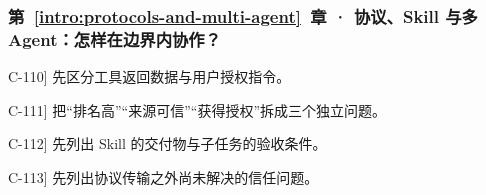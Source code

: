 \subsubsection*{第~\ref*{intro:protocols-and-multi-agent}~章 · 协议、Skill 与多 Agent：怎样在边界内协作？}
\begin{answerhints}
\item[\hyperref[exercise:retrieved-instruction-boundary]{C-110}] \leavevmode{}\label{hint:retrieved-instruction-boundary}先区分工具返回数据与用户授权指令。
\item[\hyperref[exercise:source-permission-boundaries]{C-111}] \leavevmode{}\label{hint:source-permission-boundaries}把“排名高”“来源可信”“获得授权”拆成三个独立问题。
\item[\hyperref[exercise:skill-subagent-design]{C-112}] \leavevmode{}\label{hint:skill-subagent-design}先列出 Skill 的交付物与子任务的验收条件。
\item[\hyperref[exercise:a2a-result-verification]{C-113}] \leavevmode{}\label{hint:a2a-result-verification}先列出协议传输之外尚未解决的信任问题。
\end{answerhints}
